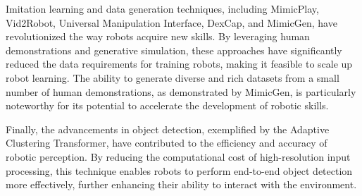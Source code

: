 \documentclass[a4paper]{article}
\begin{document}
Imitation learning and data generation techniques, including MimicPlay, Vid2Robot, Universal Manipulation Interface, DexCap, and MimicGen, have revolutionized the way robots acquire new skills. By leveraging human demonstrations and generative simulation, these approaches have significantly reduced the data requirements for training robots, making it feasible to scale up robot learning. The ability to generate diverse and rich datasets from a small number of human demonstrations, as demonstrated by MimicGen, is particularly noteworthy for its potential to accelerate the development of robotic skills.

Finally, the advancements in object detection, exemplified by the Adaptive Clustering Transformer, have contributed to the efficiency and accuracy of robotic perception. By reducing the computational cost of high-resolution input processing, this technique enables robots to perform end-to-end object detection more effectively, further enhancing their ability to interact with the environment.
\end{document}
